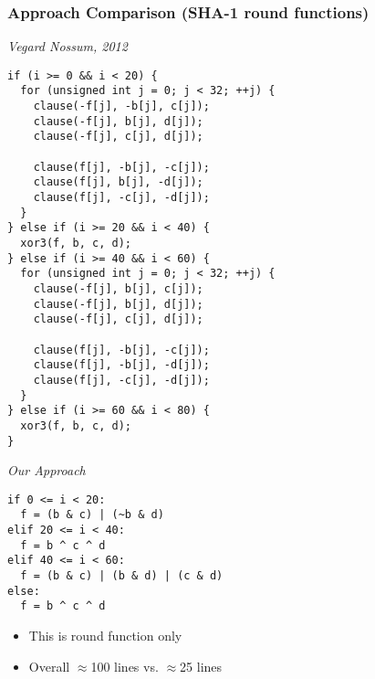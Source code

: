 \documentclass{beamer}
\begin{document}
\begin{frame}[fragile]
\frametitle{Approach Comparison (SHA-1 round functions)}
\begin{minipage}[t]{.4\textwidth}
\textit{Vegard Nossum, 2012}
{\tiny
\begin{verbatim}
if (i >= 0 && i < 20) {
  for (unsigned int j = 0; j < 32; ++j) {
    clause(-f[j], -b[j], c[j]);
    clause(-f[j], b[j], d[j]);
    clause(-f[j], c[j], d[j]);

    clause(f[j], -b[j], -c[j]);
    clause(f[j], b[j], -d[j]);
    clause(f[j], -c[j], -d[j]);
  }
} else if (i >= 20 && i < 40) {
  xor3(f, b, c, d);
} else if (i >= 40 && i < 60) {
  for (unsigned int j = 0; j < 32; ++j) {
    clause(-f[j], b[j], c[j]);
    clause(-f[j], b[j], d[j]);
    clause(-f[j], c[j], d[j]);

    clause(f[j], -b[j], -c[j]);
    clause(f[j], -b[j], -d[j]);
    clause(f[j], -c[j], -d[j]);
  }
} else if (i >= 60 && i < 80) {
  xor3(f, b, c, d);
}
\end{verbatim}}
\end{minipage}
\hfill
\begin{minipage}[t]{.5\textwidth}
\textit{Our Approach}
{\tiny
\begin{verbatim}
if 0 <= i < 20:
  f = (b & c) | (~b & d)
elif 20 <= i < 40:
  f = b ^ c ^ d
elif 40 <= i < 60:
  f = (b & c) | (b & d) | (c & d)
else:
  f = b ^ c ^ d
\end{verbatim}}
\begin{itemize}
\item This is round function only
\item Overall $\approx$100 lines vs. $\approx$25 lines
\end{itemize}
\end{minipage}
\end{frame}
\end{document}
